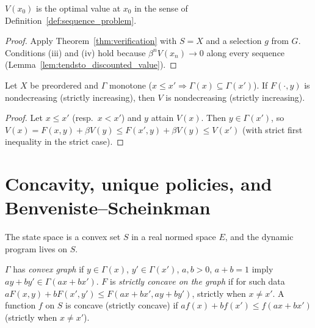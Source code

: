 \begin{corollary}
\label{cor:isOptimalValue_value}
\leanok
{}
$V(x_0)$ is the optimal value at $x_0$ in the sense of Definition~\ref{def:sequence_problem}.
\end{corollary}
\begin{proof}
\leanok
Apply Theorem~\ref{thm:verification} with $S = X$ and a selection $g$ from $G$. Conditions (iii) and (iv)
hold because $\beta^n V(x_n) \to 0$ along every sequence (Lemma~\ref{lem:tendsto_discounted_value}).
\end{proof}

\begin{theorem}
\label{thm:value_monotone}
\leanok
{}
Let $X$ be preordered and $\Gamma$ monotone ($x \le x' \Rightarrow \Gamma(x) \subseteq \Gamma(x')$). If
$F(\cdot, y)$ is nondecreasing (strictly increasing), then $V$ is nondecreasing (strictly increasing).
\end{theorem}
\begin{proof}
\leanok
Let $x \le x'$ (resp.\ $x < x'$) and $y$ attain $V(x)$. Then $y \in \Gamma(x')$, so
$V(x) = F(x, y) + \beta V(y) \le F(x', y) + \beta V(y) \le V(x')$ (with strict first inequality in the
strict case).
\end{proof}

\section{Concavity, unique policies, and Benveniste--Scheinkman}
\label{sec:dp_concavity}

The state space is a convex set $S$ in a real normed space $E$, and the dynamic program lives on $S$.

\begin{definition}
\label{def:dp_concavity}
\leanok
$\Gamma$ has \emph{convex graph} if $y \in \Gamma(x)$, $y' \in \Gamma(x')$, $a, b > 0$, $a + b = 1$ imply
$a y + b y' \in \Gamma(a x + b x')$. $F$ is \emph{strictly concave on the graph} if for such data
$a F(x, y) + b F(x', y') \le F(ax + bx', ay + by')$, strictly when $x \neq x'$. A function $f$ on $S$
is concave (strictly concave) if $a f(x) + b f(x') \le f(ax + bx')$ (strictly when $x \neq x'$).
\end{definition}

